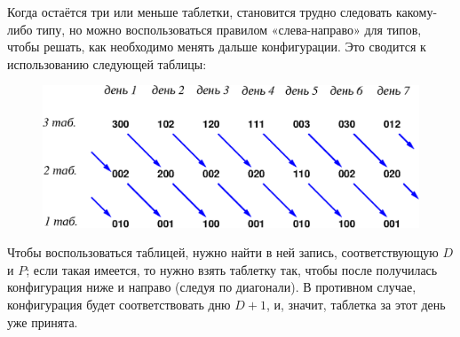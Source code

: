 Когда остаётся три или меньше таблетки, становится трудно следовать какому-либо типу, но можно воспользоваться правилом «слева-направо» для типов, чтобы решать, как необходимо менять дальше конфигурации.
Это сводится к использованию следующей таблицы:

\begin{figure}[h!]
\centering
\includegraphics[scale=0.6]{Figs/Handicaps/3box-ru}
\end{figure}

Чтобы воспользоваться таблицей, нужно найти в ней запись, соответствующую $D$ и $P$;
если такая имеется, то нужно взять таблетку так, чтобы после получилась конфигурация ниже и направо (следуя по диагонали).
В противном случае, конфигурация будет соответствовать дню $D+1$, и, значит, таблетка за этот день уже принята.
